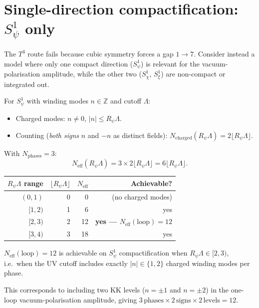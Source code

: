 \documentclass[12pt,a4paper]{article}
\newcommand{\Neff}{N_{\mathrm{eff}}}
\newcommand{\ZZ}{\mathbb{Z}}
\begin{document}
\section{Single-direction compactification: $S^1_\psi$ only}
\label{sec:s1count}

The $T^3$ route fails because cubic symmetry forces a gap $1 \to 7$.
Consider instead a model where only one compact direction ($S^1_\psi$) is
relevant for the vacuum-polarisation amplitude, while the other two ($S^1_\chi$,
$S^1_\xi$) are non-compact or integrated out.

For $S^1_\psi$ with winding modes $n \in \ZZ$ and cutoff $\Lambda$:
\begin{itemize}
  \item Charged modes: $n \neq 0$, $|n| \le R_\psi \Lambda$.
  \item Counting (\emph{both signs} $n$ and $-n$ as distinct fields):
        $N_{\mathrm{charged}}(R_\psi\Lambda) = 2\lfloor R_\psi\Lambda \rfloor$.
\end{itemize}
With $N_{\mathrm{phases}} = 3$:
\begin{equation}
  \Neff(R_\psi\Lambda) = 3 \times 2\lfloor R_\psi\Lambda \rfloor
  = 6\lfloor R_\psi\Lambda \rfloor.
\end{equation}

\begin{center}
\begin{tabular}{rrrr}
\toprule
$R_\psi\Lambda$ range & $\lfloor R_\psi\Lambda \rfloor$ & $\Neff$ & Achievable? \\
\midrule
$(0,1)$   & 0 & 0  & (no charged modes) \\
$[1,2)$   & 1 & 6  & yes \\
$[2,3)$   & 2 & 12 & \textbf{yes — $\Neff(\mathrm{loop}) = 12$} \\
$[3,4)$   & 3 & 18 & yes \\
\bottomrule
\end{tabular}
\end{center}

\begin{resultbox}
$\Neff(\mathrm{loop}) = 12$ is achievable on $S^1_\psi$ compactification
when $R_\psi\Lambda \in [2, 3)$, i.e.\ when the UV cutoff includes exactly
$|n| \in \{1, 2\}$ charged winding modes per phase.

This corresponds to including two KK levels ($n = \pm 1$ and $n = \pm 2$)
in the one-loop vacuum-polarisation amplitude, giving
$3\,\text{phases} \times 2\,\text{signs} \times 2\,\text{levels} = 12$.
\end{resultbox}
\end{document}

